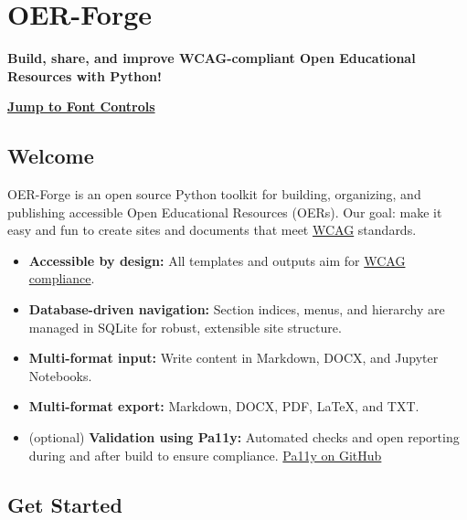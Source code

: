 \section{OER-Forge}\label{oer-forge}

\textbf{Build, share, and improve WCAG-compliant Open Educational
Resources with Python!}

\hyperref[font-controls]{\textbf{Jump to Font Controls}}

\subsection{Welcome}\label{welcome}

OER-Forge is an open source Python toolkit for building, organizing, and
publishing accessible Open Educational Resources (OERs). Our goal: make
it easy and fun to create sites and documents that meet
\href{https://www.w3.org/WAI/standards-guidelines/wcag/}{WCAG}
standards.

\begin{itemize}
\tightlist
\item
  \textbf{Accessible by design:} All templates and outputs aim for
  \href{https://www.w3.org/WAI/standards-guidelines/wcag/}{WCAG
  compliance}.
\item
  \textbf{Database-driven navigation:} Section indices, menus, and
  hierarchy are managed in SQLite for robust, extensible site structure.
\item
  \textbf{Multi-format input:} Write content in Markdown, DOCX, and
  Jupyter Notebooks.
\item
  \textbf{Multi-format export:} Markdown, DOCX, PDF, LaTeX, and TXT.
\item
  (optional) \textbf{Validation using Pa11y:} Automated checks and open
  reporting during and after build to ensure compliance.
  \href{https://github.com/pa11y/pa11y}{Pa11y on GitHub}
\end{itemize}

\subsection{Get Started}\label{get-started}

